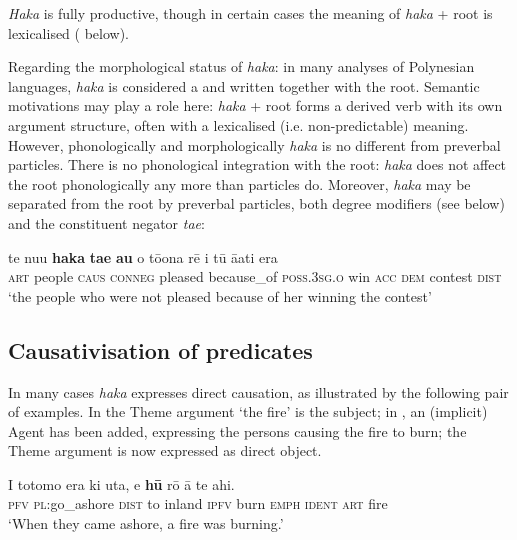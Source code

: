 \textit{Haka} is fully productive, though in certain cases the meaning of \textit{haka} + root is lexicalised ( below).

Regarding the morphological status of \textit{haka}: in many analyses of Polynesian languages, \textit{haka} is considered a  and written together with the root. Semantic motivations may play a role here: \textit{haka} + root forms a derived verb with its own argument structure, often with a lexicalised (i.e. non-predictable) meaning. However, phonologically and morphologically \textit{haka} is no different from preverbal particles. There is no phonological integration with the root: \textit{haka} does not affect the root phonologically any more than particles do. Moreover, \textit{haka} may be separated from the root by preverbal particles, both degree modifiers (see  below) and the constituent negator \textit{ta{\ꞌ}e}:

\ea\label{ex:8.220}
\gll te nu{\ꞌ}u \textbf{haka} \textbf{ta{\ꞌ}e} \textbf{au} {\ꞌ}o tō{\ꞌ}ona rē i tū {\ꞌ}ā{\ꞌ}ati era  \\
\textsc{art} people \textsc{caus} \textsc{conneg} pleased because\_of \textsc{poss.3sg.o} win \textsc{acc} \textsc{dem} contest \textsc{dist}  \\

\glt 
‘the people who were not pleased because of her winning the contest’ \textstyleExampleref{[R347.036]} 
\z

\subsection{Causativisation of  predicates}\label{sec:8.12.2}
In many cases \textit{haka} expresses direct causation, as illustrated by the following pair of examples. In  the Theme argument ‘the fire’ is the subject; in , an (implicit) Agent has been added, expressing the persons causing the fire to burn; the Theme argument is now expressed as direct object.

\ea\label{ex:8.221}
\gll I totomo era ki {\ꞌ}uta, e \textbf{hū} rō {\ꞌ}ā te ahi. \\
\textsc{pfv} \textsc{pl}:go\_ashore \textsc{dist} to inland \textsc{ipfv} burn \textsc{emph} \textsc{ident} \textsc{art} fire \\

\glt 
‘When they came ashore, a fire was burning.’ \textstyleExampleref{[R359.019]} 
\z


